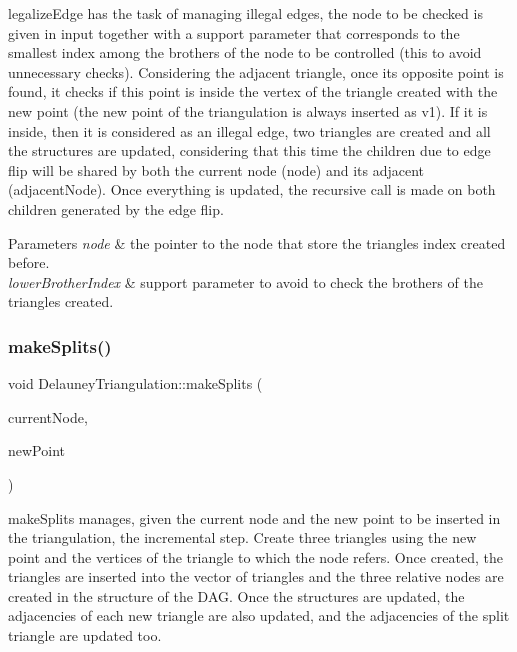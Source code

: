legalize\+Edge has the task of managing illegal edges, the node to be checked is given in input together with a support parameter that corresponds to the smallest index among the brothers of the node to be controlled (this to avoid unnecessary checks). Considering the adjacent triangle, once its opposite point is found, it checks if this point is inside the vertex of the triangle created with the new point (the new point of the triangulation is always inserted as v1). If it is inside, then it is considered as an illegal edge, two triangles are created and all the structures are updated, considering that this time the children due to edge flip will be shared by both the current node (node) and its adjacent (adjacent\+Node). Once everything is updated, the recursive call is made on both children generated by the edge flip. 


\begin{DoxyParams}{Parameters}
{\em node} & the pointer to the node that store the triangle\textquotesingle{}s index created before. \\
\hline
{\em lower\+Brother\+Index} & support parameter to avoid to check the brothers of the triangles created. \\
\hline
\end{DoxyParams}
\mbox{\label{classDelauneyTriangulation_a30d7b8239f8317887052a4f3046c48af}} 
\subsubsection{\texorpdfstring{make\+Splits()}{makeSplits()}}
{\footnotesize\ttfamily void Delauney\+Triangulation\+::make\+Splits (\begin{DoxyParamCaption}\item[{\hyperlink{classDagNode}{Dag\+Node} $\ast$}]{current\+Node,  }\item[{const cg3\+::\+Point2\+Dd \&}]{new\+Point }\end{DoxyParamCaption})}



make\+Splits manages, given the current node and the new point to be inserted in the triangulation, the incremental step. Create three triangles using the new point and the vertices of the triangle to which the node refers. Once created, the triangles are inserted into the vector of triangles and the three relative nodes are created in the structure of the D\+AG. Once the structures are updated, the adjacencies of each new triangle are also updated, and the adjacencies of the split triangle are updated too. 


